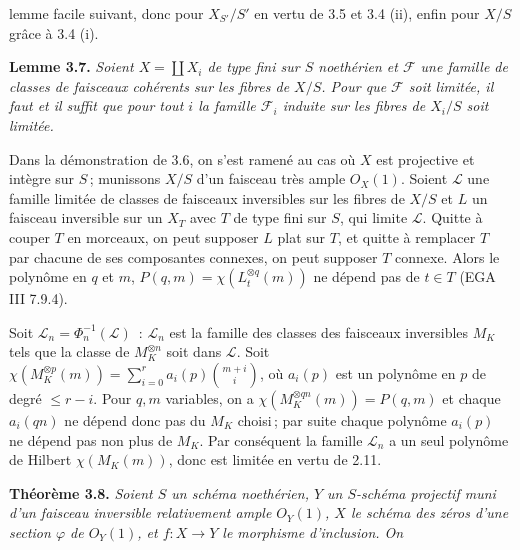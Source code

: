 
lemme facile suivant, donc pour \(X_{S'}/S'\) en vertu de 3.5 et 3.4 (ii), enfin pour \(X/S\) gr\^ace \`a 3.4 (i).

\textbf{Lemme 3.7.} \emph{Soient \(X=\coprod X_i\) de type fini sur \(S\) noeth\'erien et \(\mathcal F\) une famille de classes de faisceaux coh\'erents sur les fibres de \(X/S\). Pour que \(\mathcal F\) soit limit\'ee, il faut et il suffit que pour tout \(i\) la famille \(\mathcal F_i\) induite sur les fibres de \(X_i/S\) soit limit\'ee.}

Dans la d\'emonstration de 3.6, on s'est ramen\'e au cas o\`u \(X\) est projective et int\`egre sur \(S\)\,; munissons \(X/S\) d'un faisceau tr\`es ample \({O}_X(1)\). Soient \(\mathcal L\) une famille limit\'ee de classes de faisceaux inversibles sur les fibres de \(X/S\) et \(L\) un faisceau inversible sur un \(X_T\) avec \(T\) de type fini sur \(S\), qui limite \(\mathcal L\). Quitte \`a couper \(T\) en morceaux, on peut supposer \(L\) plat sur \(T\), et quitte \`a remplacer \(T\) par chacune de ses composantes connexes, on peut supposer \(T\) connexe. Alors le polyn\^ome en \(q\) et \(m\), \(P(q,m)=\chi(L_t^{\otimes q}(m))\) ne d\'epend pas de \(t\in T\) (EGA III 7.9.4).

Soit \(\mathcal L_n=\Phi_n^{-1}(\mathcal L)\)~: \(\mathcal L_n\) est la famille des classes des faisceaux inversibles \(M_K\) tels que la classe de \(M_K^{\otimes n}\) soit dans \(\mathcal L\). Soit \(\chi(M_K^{\otimes p}(m))=\sum_{i=0}^{r}a_i(p)\binom{m+i}{i}\), o\`u \(a_i(p)\) est un polyn\^ome en \(p\) de degr\'e \(\le r-i\). Pour \(q,m\) variables, on a \(\chi(M_K^{\otimes qn}(m))=P(q,m)\) et chaque \(a_i(qn)\) ne d\'epend donc pas du \(M_K\) choisi\,; par suite chaque polyn\^ome \(a_i(p)\) ne d\'epend pas non plus de \(M_K\). Par cons\'equent la famille \(\mathcal L_n\) a un seul polyn\^ome de Hilbert \(\chi(M_K(m))\), donc est limit\'ee en vertu de 2.11.

\textbf{Th\'eor\`eme 3.8.} \emph{Soient \(S\) un sch\'ema noeth\'erien, \(Y\) un \(S\)-sch\'ema projectif muni d'un faisceau inversible relativement ample \({O}_Y(1)\), \(X\) le sch\'ema des z\'eros d'une section \(\varphi\) de \({O}_Y(1)\), et \(f:X\to Y\) le morphisme d'inclusion. On}
